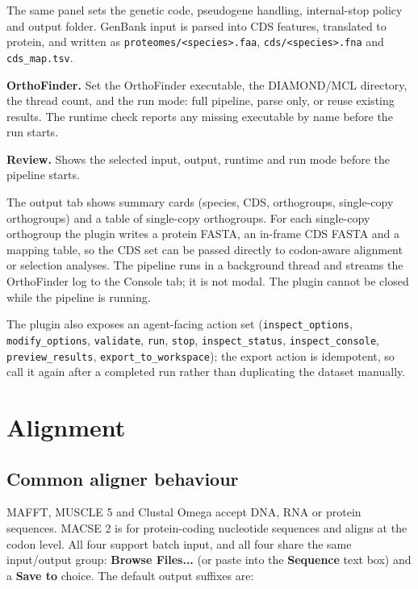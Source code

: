 \documentclass[10pt]{report}
\begin{document}
The same panel sets the genetic code, pseudogene handling, internal-stop
policy and output folder. GenBank input is parsed into CDS features,
translated to protein, and written as \texttt{proteomes/<species>.faa},
\texttt{cds/<species>.fna} and \texttt{cds\_map.tsv}.

\textbf{OrthoFinder.} Set the OrthoFinder executable, the DIAMOND/MCL
directory, the thread count, and the run mode: full pipeline, parse only, or
reuse existing results. The runtime check reports any missing executable by
name before the run starts.

\textbf{Review.} Shows the selected input, output, runtime and run mode before
the pipeline starts.

The output tab shows summary cards (species, CDS, orthogroups, single-copy
orthogroups) and a table of single-copy orthogroups. For each single-copy
orthogroup the plugin writes a protein FASTA, an in-frame CDS FASTA and a
mapping table, so the CDS set can be passed directly to codon-aware alignment
or selection analyses. The pipeline runs in a background thread and streams the
OrthoFinder log to the Console tab; it is not modal. The plugin cannot be
closed while the pipeline is running.

The plugin also exposes an agent-facing action set
(\texttt{inspect\_options}, \texttt{modify\_options}, \texttt{validate},
\texttt{run}, \texttt{stop}, \texttt{inspect\_status},
\texttt{inspect\_console}, \texttt{preview\_results},
\texttt{export\_to\_workspace}); the export action is idempotent, so call it
again after a completed run rather than duplicating the dataset manually.

\chapter{Alignment}

\section{Common aligner behaviour}

MAFFT, MUSCLE 5 and Clustal Omega accept DNA, RNA or protein sequences. MACSE
2 is for protein-coding nucleotide sequences and aligns at the codon level. All
four support batch input, and all four share the same input/output group:
\textbf{Browse Files...} (or paste into the \textbf{Sequence} text box) and a
\textbf{Save to} choice. The default output suffixes are:
\end{document}
